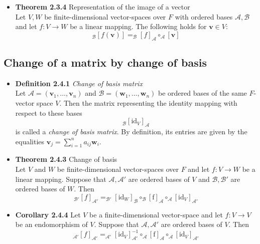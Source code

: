 \documentclass[11pt,a4paper]{article}
\begin{document}
\begin{itemize}
    \item \textbf{Theorem 2.3.4} Representation of the image of a vector \\
        Let $V,W$ be finite-dimensional vector-spaces over $F$ with ordered bases $\mathcal{A,B}$
        and let $f : V \to W$ be a linear mapping.
        The following holds for $\textbf{v} \in V$:
        \[
            _\mathcal{B}{[f(\textbf{v})]} = _\mathcal{B}{[f]}_\mathcal{A} \circ
            _\mathcal{A}[\textbf{v}]
        \]
\end{itemize}

\subsection{Change of a matrix by change of basis}

\begin{itemize}

    \item \textbf{Definition 2.4.1} \emph{Change of basis matrix} \\
        Let $\mathcal{A} = (\textbf{v}_1, \ldots, \textbf{v}_n)$ and $\mathcal{B} =
        (\textbf{w}_1, \ldots, \textbf{w}_n)$
        be ordered bases of the same $F$-vector space $V$.
        Then the matrix representing the identity mapping with respect to these bases
        \[
            _\mathcal{B}{[\mathrm{id}_V]}_\mathcal{A}
        \]
        is called a \emph{change of basis matrix}.
        By definition, its entries are given by the equalities $\textbf{v}_j =
        \sum_{i=1}^n a_{ij}\textbf{w}_i$.

    \item \textbf{Theorem 2.4.3} Change of basis \\
        Let $V$ and $W$ be finite-dimensional vector-spaces over $F$ and let $f : V \to W$
        be a linear mapping.
        Suppose that $\mathcal{A, A'}$ are ordered bases of $V$ and $\mathcal{B, B'}$
        are ordered bases of $W$.
        Then
        \[
            _\mathcal{B'}{[f]}_\mathcal{A'} = _\mathcal{B'}{[\mathrm{id}_W]}_\mathcal{B} \circ
            _\mathcal{B}{[\mathrm{f}]}_\mathcal{A} \circ _\mathcal{A}{[\mathrm{id}_V]}_\mathcal{A'}
        \]

    \item \textbf{Corollary 2.4.4}
        Let $V$ be a finite-dimensional vector-space and let
        $f : V \to V$ be an endomorphism of $V$.
        Suppose that $\mathcal{A, A'}$ are ordered bases of $V$.
        Then
        \[
            _\mathcal{A'}{[f]}_\mathcal{A'} = _\mathcal{A'}{[\mathrm{id}_V]}^{-1}_\mathcal{A'}
            \circ _\mathcal{A}{[\mathrm{f}]}_\mathcal{A} \circ _\mathcal{A}
            {[\mathrm{id}_V]}_\mathcal{A'}
        \]


\end{itemize}
\end{document}
